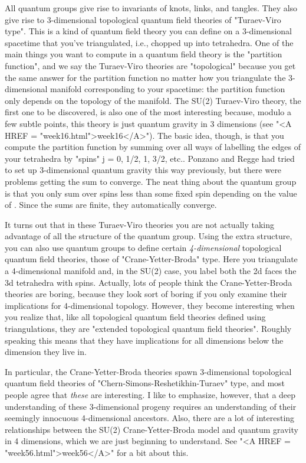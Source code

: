  All quantum groups give rise to invariants of knots, links, and
tangles.  They also give rise to 3-dimensional topological quantum
field theories of "Turaev-Viro type".  This is a kind of
quantum field theory you can define on a 3-dimensional spacetime that
you've triangulated, i.e., chopped up into tetrahedra.  One of the
main things you want to compute in a quantum field theory is the
"partition function", and we say the Turaev-Viro theories
are "topological" because you get the same answer for the
partition function no matter how you triangulate the 3-dimensional
manifold corresponding to your spacetime: the partition function only
depends on the topology of the manifold.  The SU(2) Turaev-Viro
theory, the first one to be discovered, is also one of the most
interesting because, modulo a few subtle points, this theory is just
quantum gravity in 3 dimensions (see "<A HREF =
"week16.html">week16</A>").  The basic idea, though, is that you
compute the partition function by summing over all ways of labelling
the edges of your tetrahedra by "spins" j = 0, 1/2, 1, 3/2,
etc..  Ponzano and Regge had tried to set up 3-dimensional quantum
gravity this way previously, but there were problems getting the sum
to converge.  The neat thing about the quantum group is that you only
sum over spins less than some fixed spin depending on the value of
\hbar .  Since the sums are finite, they automatically converge.


 It turns out that in these Turaev-Viro theories you are not
actually taking advantage of all the structure of the quantum group.
Using the extra structure, you can also use quantum groups to define
certain \emph{4-dimensional} topological quantum field theories, those of
"Crane-Yetter-Broda" type.  Here you triangulate a
4-dimensional manifold and, in the SU(2) case, you label both the 2d
faces the 3d tetrahedra with spins.  Actually, lots of people think
the Crane-Yetter-Broda theories are boring, because they look sort of
boring if you only examine their implications for 4-dimensional
topology.  However, they become interesting when you realize that,
like all topological quantum field theories defined using
triangulations, they are "extended topological quantum field
theories".  Roughly speaking this means that they have
implications for all dimensions below the dimension they live in.


 In particular, the Crane-Yetter-Broda theories spawn 3-dimensional
topological quantum field theories of
"Chern-Simons-Reshetikhin-Turaev" type, and most people
agree that \emph{these} are interesting.  I like to emphasize, however,
that a deep understanding of these 3-dimensional progeny requires an
understanding of their seemingly innocuous 4-dimensional ancestors.
Also, there are a lot of interesting relationships between the SU(2)
Crane-Yetter-Broda model and quantum gravity in 4 dimensions, which we
are just beginning to understand.  See "<A HREF =
"week56.html">week56</A>" for a bit about this.

